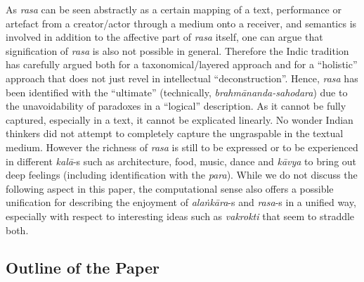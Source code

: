 As \textsl{rasa} can be seen abstractly as a certain mapping of a text, performance or artefact from a creator/actor through a medium onto a receiver, and semantics is involved in addition to the affective part of \textsl{rasa} itself, one can argue that signification of \textsl{rasa} is also not possible in general. Therefore the Indic tradition has carefully argued both for a taxonomical/layered approach and for a “holistic” approach that does not just revel in intellectual “deconstruction”. Hence, \textsl{rasa} has been identified with the “ultimate” (technically, \textsl{brahmānanda-sahodara}) due to the unavoidability of paradoxes in a “logical” description. As it cannot be fully captured, especially in a text, it cannot be explicated linearly. No wonder Indian thinkers did not attempt to completely capture the ungraspable in the textual medium. However the richness of \textsl{rasa} is still to be expressed or to be experienced in different \textsl{kalā}-s such as architecture, food, music, dance and \textsl{kāvya} to bring out deep feelings (including identification with the \textsl{para}). While we do not discuss the following aspect in this paper, the computational sense also offers a possible unification for describing the enjoyment of \textsl{alaṅkāra}-s and \textsl{rasa}-s in a unified way, especially with respect to interesting ideas such as \textsl{vakrokti} that seem to straddle both.

\subsection{Outline of the Paper}\label{chap3-sec1.2}

